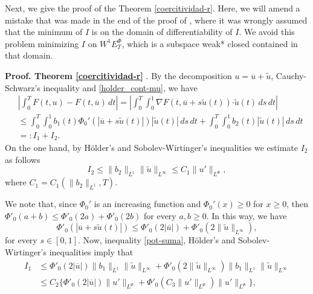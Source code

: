 \documentclass[twoside]{article}
\theoremstyle{remark}
\newcommand{\orlnor}{\|_{L^{\Phi}}}
\newcommand{\ephi}{E^{\Phi}}
\newcommand{\wphiet}{W^{1}\ephi_T}
\renewcommand{\b}[1]{\boldsymbol{#1}}
\newcommand{\ccdot}{\b{\cdot}}
\renewcommand{\leq}{\leqslant}
\renewcommand{\geq}{\geqslant}
\begin{document}
Next, we give the proof of the Theorem \ref{coercitividad-r}.  Here,  we will amend a mistake that was made in the end of the proof of  \cite[Thm. 6.2]{ABGMS2015},  where it was wrongly assumed that  the minimum of  $I$ is on the domain of differentiability of $I$. We avoid this problem minimizing $I$ on $\wphiet$, which is a subspace weak* closed contained in that domain.

\noindent\textbf{Proof. Theorem \ref{coercitividad-r} }. By the decomposition $u=\overline{u}+\tilde{u}$,   Cauchy-Schwarz's inequality
and \eqref{holder_cont-mu}, we have
\begin{equation}\label{cota-diferencia-F}
\begin{split}
&\left|\int_0^T F(t,u)-F(t,\overline{u})\,dt\right|=
\left|\int_0^T \int_0^1 \nabla F(t,\overline{u}+s\tilde{u}(t))\ccdot \tilde{u}(t) \,ds \,dt\right|
\\
&\leq \int_0^T \int_0^1 b_1(t)\Phi_0'(|\overline{u}+s\tilde{u}(t)|)|\tilde{u}(t)|\,ds\,dt+
\int_0^T \int_0^1 b_2(t)|\tilde{u}(t)|\,ds\,dt
\\
&=:I_1+I_2.
\end{split}
\end{equation}
On the one hand, by H\"older's and Sobolev-Wirtinger's inequalities we estimate $I_2$ as follows
\begin{equation}\label{cota-i2}
I_2\leq \|b_2\|_{L^1} \|\tilde{u}\|_{L^{\infty}}\leq
C_1\|u'\orlnor,
\end{equation}
 where $C_1=C_1(\|b_2\|_{L^1}, T)$. 

We note that, since $\Phi_0'$ is an increasing function  and $\Phi_0'(x)\geq 0$ for $x\geq 0$, then $\Phi'_0(a+b)\leq \Phi'_0(2a)+\Phi'_0(2b)$ for every $a,b\geq 0$.
In this way, we have
\begin{equation}\label{pot-suma}
\Phi'_0(|\overline{u}+s\tilde{u}(t)|)\leq
\Phi'_0(2|\overline{u}|)+\Phi'_0(2\|\tilde{u}\|_{L^{\infty}}),
\end{equation}
for every $s \in [0,1]$.  Now,  inequality \eqref{pot-suma}, H\"older's and Sobolev-Wirtinger's inequalities imply that
\begin{equation}\label{cota-i1}
\begin{split}
I_1&
\leq \Phi'_0(2|\overline{u}|) \|b_1\|_{L^1} \|\tilde{u}\|_{L^{\infty}}+\Phi'_0(2\|\tilde{u}\|_{L^\infty})
 \|b_1\|_{L^1}\|\tilde{u}\|_{L^\infty}
\\
&\leq C_2 \bigg\{ \Phi'_0(2|\overline{u}|) \|u'\orlnor
+\Phi'_0(C_3\|u'\orlnor) \|u'\orlnor\bigg\},
\end{split}
\end{equation}
\end{document}

